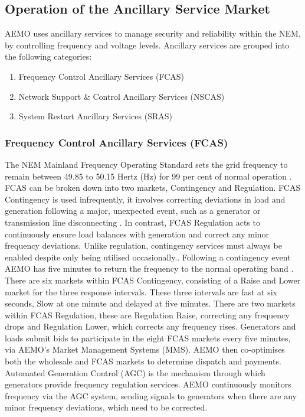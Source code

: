 \subsection{ Operation of the Ancillary Service Market }
AEMO uses ancillary services to manage security and reliability within the NEM, by controlling frequency and voltage levels. Ancillary services are grouped into the following categories:
\begin{enumerate}
    \item Frequency Control Ancillary Services (FCAS)
    \item Network Support \& Control Ancillary Services (NSCAS)
    \item System Restart Ancillary Services (SRAS)
\end{enumerate}
\subsubsection{Frequency Control Ancillary Services (FCAS)} \label{fcas}
The NEM Mainland Frequency Operating Standard sets the grid frequency to remain between 49.85 to 50.15 Hertz (Hz) for 99 per cent of normal operation \parencite{FrequencyReq}. FCAS can be broken down into two markets, Contingency and Regulation. FCAS Contingency is used infrequently, it involves correcting deviations in load and generation following a major, unexpected event, such as a generator or transmission line disconnecting \parencite{Boyle}.  In contrast, FCAS Regulation acts to continuously ensure load balances with generation and correct any minor frequency deviations.
\newline
\newline
Unlike regulation, contingency services must always be enabled despite only being utilised occasionally.. Following a contingency event AEMO has five minutes to return the frequency to the normal operating band \parencite{FrequencyReq}. There are six markets within FCAS Contingency, consisting of a Raise and Lower market for the three response intervals. These three intervals are fast at six seconds, Slow at one minute and delayed at five minutes. There are two markets within FCAS Regulation, these are Regulation Raise, correcting any frequency drops and Regulation Lower, which corrects any frequency rises. Generators and loads submit bids to participate in the eight FCAS markets every five minutes, via AEMO’s Market Management Systems (MMS). AEMO then co-optimises both the wholesale and FCAS markets to determine dispatch and payments. Automated Generation Control (AGC) is the mechanism through which generators provide frequency regulation services. AEMO continuously monitors frequency via the AGC system, sending signals to generators when there are any minor frequency deviations, which need to be corrected.

